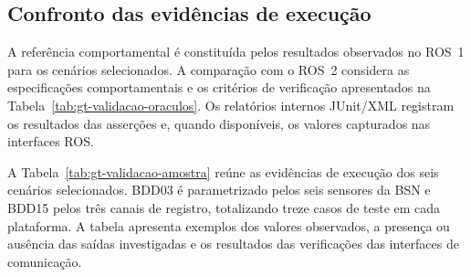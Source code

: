\subsection{Confronto das evidências de execução}
\label{subsec:gt-validacao-execucoes}


A referência comportamental é constituída pelos resultados observados no ROS~1 para os cenários selecionados. A comparação com o ROS~2 considera as especificações comportamentais e os critérios de verificação apresentados na Tabela~\ref{tab:gt-validacao-oraculos}. Os relatórios internos JUnit/XML registram os resultados das asserções e, quando disponíveis, os valores capturados nas interfaces ROS.

A Tabela~\ref{tab:gt-validacao-amostra} reúne as evidências de execução dos seis cenários selecionados. BDD03 é parametrizado pelos seis sensores da BSN e BDD15 pelos três canais de registro, totalizando treze casos de teste em cada plataforma. A tabela apresenta exemplos dos valores observados, a presença ou ausência das saídas investigadas e os resultados das verificações das interfaces de comunicação.

